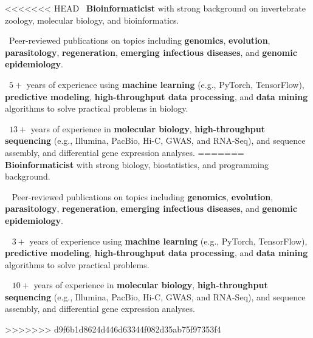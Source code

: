 \documentclass[11pt, letterpaper, sans]{moderncv}
\begin{document}
\thispagestyle{empty}\maketitle


\vspace{-3em}

<<<<<<< HEAD
\textbullet~\textbf{Bioinformaticist} with strong background on invertebrate zoology, molecular biology, and bioinformatics.

\textbullet~Peer-reviewed publications on topics including \textbf{genomics}, \textbf{evolution}, \textbf{parasitology}, \textbf{regeneration}, \textbf{emerging infectious diseases}, and \textbf{genomic epidemiology}.

\textbullet~$5+$ years of experience using \textbf{machine learning} (e.g., PyTorch, TensorFlow), \textbf{predictive modeling}, \textbf{high-throughput data processing}, and \textbf{data mining} algorithms to solve practical problems in biology.

\textbullet~$13+$ years of experience in \textbf{molecular biology}, \textbf{high-throughput sequencing} (e.g., Illumina, PacBio, Hi-C, GWAS, and RNA-Seq), and sequence assembly, and differential gene expression analyses.
=======
\textbullet~ \textbf{Bioinformaticist} with strong biology, biostatistics, and programming background.

\textbullet~ Peer-reviewed publications on topics including \textbf{genomics}, \textbf{evolution}, \textbf{parasitology}, \textbf{regeneration}, \textbf{emerging infectious diseases}, and \textbf{genomic epidemiology}.

\textbullet~ $3+$ years of experience using \textbf{machine learning} (e.g., PyTorch, TensorFlow), \textbf{predictive modeling}, \textbf{high-throughput data processing}, and \textbf{data mining} algorithms to solve practical problems.

\textbullet~ $10+$ years of experience in \textbf{molecular biology}, \textbf{high-throughput sequencing} (e.g., Illumina, PacBio, Hi-C, GWAS, and RNA-Seq), and sequence assembly, and differential gene expression analyses.

>>>>>>> d9f6b1d8624d446d63344f082d35ab75f97353f4

\end{document}
